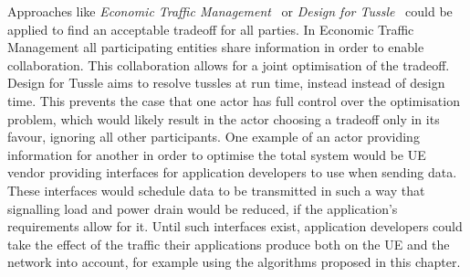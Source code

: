 Approaches like \emph{Economic Traffic Management}~\cite{spirou2009} or \emph{Design for Tussle}~\cite{trilogy2008} could be applied to find
an acceptable tradeoff for all parties.
In Economic Traffic Management all participating entities share information in order to enable collaboration.
This collaboration allows for a joint optimisation of the tradeoff.
Design for Tussle aims to resolve tussles at run time, instead instead of design time.
This prevents the case that one actor has full control over the optimisation problem, which would likely result in the actor choosing a tradeoff only in its favour, ignoring all other participants.
One example of an actor providing information for another in order to optimise the total system would be \gls{UE} vendor providing interfaces for application developers to use when sending data.
These interfaces would schedule data to be transmitted in such a way that signalling load and power drain would be reduced, if the application’s requirements allow for it.
Until such interfaces exist, application developers could take the effect of the traffic their applications
produce both on the UE and the network into account, for example using the algorithms proposed in this chapter. 